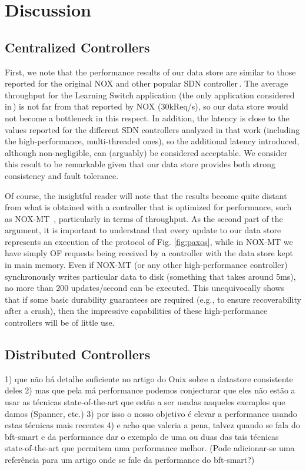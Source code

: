 \section{Discussion}
\subsection{Centralized Controllers}

First, we note that the performance results of our data store are similar to those reported for the original NOX and other popular SDN controller\,\cite{Tootoonchian:2012:CPS:2228283.2228297}.
The average throughput for the Learning Switch application (the only application considered in\,\cite{Tootoonchian:2012:CPS:2228283.2228297}) is not far from that reported by NOX (30kReq/s), so our data store would not become a bottleneck in this respect.
In addition, the latency is close to the values reported for the different SDN controllers analyzed in that work (including the high-performance, multi-threaded ones), so the additional latency introduced, although non-negligible, can (arguably) be considered acceptable.
We consider this result to be remarkable given that our data store provides both strong consistency and fault tolerance.

Of course, the insightful reader will note that the results become quite distant from what is obtained with a controller that is optimized for performance, such as NOX-MT~\cite{Tootoonchian:2012:CPS:2228283.2228297}, particularly in terms of throughput.
As the second part of the argument, it is important to understand that every update to our data store represents an execution of the protocol of Fig. \ref{fig:paxos}, while in NOX-MT we have simply OF requests being received by a controller with the data store kept in main memory.
Even if NOX-MT (or any other high-performance controller) synchronously writes particular data to disk (something that takes around 5ms), no more than 200 updates/second can be executed.
This unequivocally shows that if some basic durability guarantees are required (e.g., to ensure recoverability after a crash), then the impressive capabilities of these high-performance controllers will be of little use.

\subsection{Distributed Controllers}

1) que não há detalhe suficiente no artigo do Onix sobre a datastore
consistente deles
2) mas que pela má performance podemos conjecturar que eles não estão a usar
as técnicas state-of-the-art que estão a ser usadas naqueles exemplos que
damos (Spanner, etc.)
3) por isso o nosso objetivo é elevar a performance usando estas técnicas
mais recentes
4) e acho que valeria a pena, talvez quando se fala do bft-smart e da
performance dar o exemplo de uma ou duas das tais técnicas state-of-the-art
que permitem uma performance melhor. (Pode adicionar-se uma referência para
um artigo onde se fale da performance do bft-smart?)


